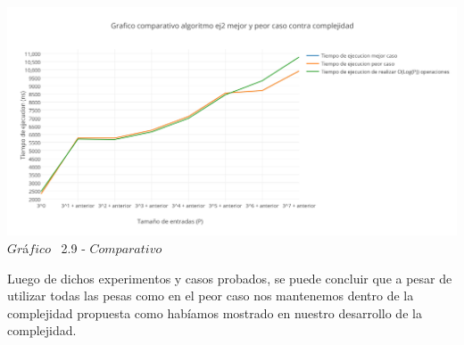   \vspace*{0.3cm} \vspace*{0.3cm}
  \begin{center}
 \includegraphics[scale=0.65]{./EJ2/comparativo2.png}
 {$Gr$\'a$fico$ \ 2.9 - $Comparativo$}
  \end{center}
  \vspace*{0.3cm}

Luego de dichos experimentos y casos probados, se puede concluir que a pesar de utilizar todas las pesas como en el peor caso nos mantenemos dentro de la complejidad propuesta como hab\'iamos mostrado en nuestro desarrollo de la complejidad.\\
